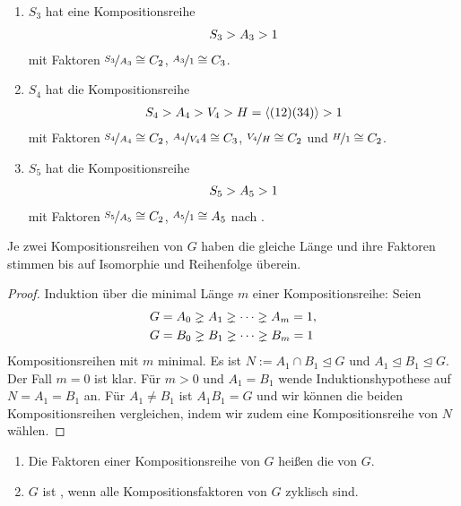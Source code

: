 \begin{example}
	\begin{enumerate}[label=(\alph*)]
		\item $S_3$ hat eine Kompositionsreihe
		\begin{align}
			S_3 > A_3 > 1 \notag %
		\end{align}
		mit Faktoren $\nicefrac{S_3}{A_3} \cong C_2$, $\nicefrac{A_3}{1} \cong C_3$.
		\item $S_4$ hat die Kompositionsreihe
		\begin{align}
			S_4 > A_4 > V_4 > H=\langle (12)(34)\rangle > 1 \notag %
		\end{align}
		mit Faktoren $\nicefrac{S_4}{A_4} \cong C_2$, $\nicefrac{A_4}{V_4}4 \cong C_3$, $\nicefrac{V_4}{H} \cong C_2$ und $\nicefrac{H}{1}\cong C_2$.
		\item $S_5$ hat die Kompositionsreihe
		\begin{align}
			S_5 > A_5 > 1\notag %
		\end{align}
		mit Faktoren $\nicefrac{S_5}{A_5} \cong C_2$, $\nicefrac{A_5}{1} \cong A_5$ nach .
	\end{enumerate}
\end{example}

\begin{theorem}
	Je zwei Kompositionsreihen von $G$ haben die gleiche Länge und ihre Faktoren stimmen bis auf Isomorphie und Reihenfolge überein.
\end{theorem}

\begin{proof}
	 Induktion über die minimal Länge $m$ einer Kompositionsreihe: Seien
	 \begin{align}
	 	G &= A_0 \gneq A_1 \gneq \dotsm \gneq A_m = 1,\notag \\ %
	 	G &= B_0 \gneq B_1 \gneq \dotsm \gneq B_m = 1\notag
	 \end{align}
	 Kompositionsreihen mit $m$ minimal. Es ist $N := A_1 \cap B_1 \unlhd G$ und $A_1 \unlhd B_1 \unlhd G$. Der Fall $m = 0$ ist klar. Für $m > 0$ und $A_1 = B_1$ wende Induktionshypothese auf $N = A_1 = B_1$ an.
	 Für $A_1 \neq B_1$ ist $A_1 B_1 = G$ und wir können die beiden Kompositionsreihen vergleichen, indem wir zudem eine Kompositionsreihe von $N$ wählen.
\end{proof}

\begin{definition}
	\begin{enumerate}[label=(\alph*)]
		\item Die Faktoren einer Kompositionsreihe von $G$ heißen die  von $G$.
		\item $G$ ist , wenn alle Kompositionsfaktoren von $G$ zyklisch sind.
	\end{enumerate}
\end{definition}

